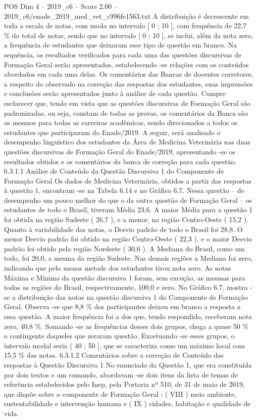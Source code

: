 \begin{textsample}{POS Dim 4 – 2019\_c6 – Score 2.00 – 2019\_c6/enade\_2019\_med\_vet\_c996fe1563.txt}
A distribuição é decrescente em toda a escala de notas, com moda no intervalo [ 0 ; 10 ], com frequência de 22,7 \% do total de notas, sendo que no intervalo [ 0 ; 10 ], se inclui, além da nota zero, a frequência de estudantes que deixaram esse tipo de questão em branco.
Na sequência, os resultados verificados para cada uma das questões discursivas de Formação Geral serão apresentados, estabelecendo -se relações com os conteúdos abordados em cada uma delas.
Os comentários das Bancas de docentes corretores, a respeito do observado na correção das respostas dos estudantes, suas impressões e conclusões serão apresentados junto à análise de cada questão.
Cumpre esclarecer que, tendo em vista que as questões discursivas de Formação Geral são padronizadas, ou seja, constam de todas as provas, os comentários da Banca são os mesmos para todas as carreiras acadêmicas, sendo direcionados a todos os estudantes que participaram do Enade/2019.
A seguir, será analisado o desempenho linguístico dos estudantes da Área de Medicina Veterinária nas duas questões discursivas de Formação Geral do Enade/2019, apresentando -se os resultados obtidos e os comentários da banca de correção para cada questão. 6.3.1.1 Análise de Conteúdo da Questão Discursiva 1 do Componente de Formação Geral Os dados de Medicina Veterinária, obtidos a partir das respostas à questão 1, encontram -se na Tabela 6.14 e no Gráfico 6.7.
Nessa questão – de desempenho um pouco melhor do que o da outra questão de Formação Geral – os estudantes de todo o Brasil, tiveram Média 23,6.
A maior Média para a questão 1 foi obtida na região Sudeste ( 26,7 ), e a menor, na região Centro-Oeste ( 15,2 ).
Quanto à variabilidade das notas, o Desvio padrão de todo o Brasil foi 28,8.
O menor Desvio padrão foi obtido na região Centro-Oeste ( 22,3 ), e o maior Desvio padrão foi obtido pela região Nordeste ( 30,6 ).
A Mediana do Brasil, como um todo, foi 20,0, a mesma da região Sudeste.
Nas demais regiões a Mediana foi zero, indicando que pelo menos metade dos estudantes tirou nota zero.
As notas Máxima e Mínima da questão discursiva 1 foram, sem exceção, as mesmas para todas as regiões do Brasil, respectivamente, 100,0 e zero.
No Gráfico 6.7, mostra -se a distribuição das notas na questão discursiva 1 do Componente de Formação Geral.
Observa -se que 8,8 \% dos participantes deixou em branco a resposta a essa questão.
A maior frequência foi a dos que, tendo respondido, receberam nota zero, 40,8 \%.
Somando -se as frequências desses dois grupos, chega a quase 50 \% o contingente daqueles que zeraram questão.
Excetuando -se esses grupos, o intervalo modal seria ( 40 ; 50 ], que se caracteriza como um máximo local com 15,5 \% das notas. 6.3.1.2 Comentários sobre a correção de Conteúdo das respostas à Questão Discursiva 1 No enunciado da Questão 1, que era constituída por dois textos e um comando, abordavam -se dois itens da lista de temas de referência estabelecidos pelo Inep, pela Portaria nº 510, de 31 de maio de 2019, que dispõe sobre o componente de Formação Geral : ( VIII ) meio ambiente, sustentabilidade e intervenção humana e ( IX ) cidades, habitação e qualidade de vida.

\end{textsample}
